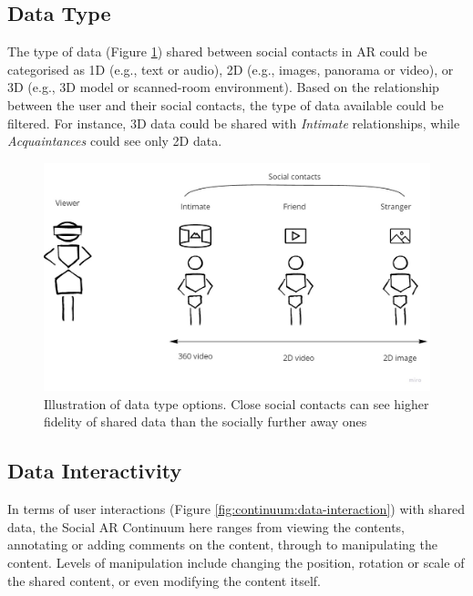 


\subsection{Data Type}

The type of data (Figure \ref{fig:continuum:data-type}) shared between social contacts in AR could be categorised as 1D (e.g., text or audio), 2D (e.g., images, panorama or video), or 3D (e.g., 3D model or scanned-room environment). Based on the relationship between the user and their social contacts, the type of data available could be filtered. For instance, 3D data could be shared with \textit{Intimate} relationships, while \textit{Acquaintances} could see only 2D data.  

\begin{figure}[ht]
    \centering
    \includegraphics[width=0.8\linewidth]{images/30-continuum/Continuum-Data-type.jpg}
    \caption{Illustration of data type options. Close social contacts can see higher fidelity of shared data than the socially further away ones}
    \label{fig:continuum:data-type}
\end{figure}

\subsection{Data Interactivity}

In terms of user interactions (Figure \ref{fig:continuum:data-interaction}) with shared data, the Social AR Continuum here ranges from viewing the contents, annotating or adding comments on the content, through to manipulating the content. Levels of manipulation include changing the position, rotation or scale of the shared content, or even modifying the content itself.

